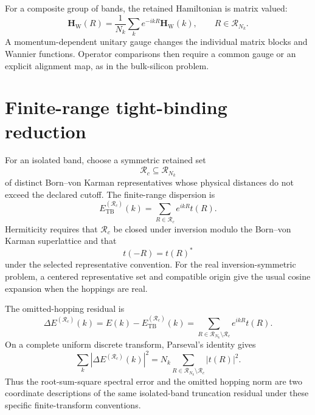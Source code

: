 For a composite group of bands, the retained Hamiltonian is matrix valued:
\begin{equation}
    \mathbf H_{\mathrm W}(R)
    =
    \frac{1}{N_k}
    \sum_k
    e^{-ikR}
    \mathbf H_{\mathrm W}(k),
    \qquad
    R\in\mathcal R_{N_k}.
\end{equation}
A momentum-dependent unitary gauge changes the individual matrix blocks and
Wannier functions. Operator comparisons then require a common gauge or an
explicit alignment map, as in the bulk-silicon problem.

\section*{Finite-range tight-binding reduction}

For an isolated band, choose a symmetric retained set
\begin{equation}
    \mathcal R_c
    \subseteq
    \mathcal R_{N_k}
\end{equation}
of distinct Born--von Karman representatives whose physical distances do not
exceed the declared cutoff. The finite-range dispersion is
\begin{equation}
    E_{\mathrm{TB}}^{(\mathcal R_c)}(k)
    =
    \sum_{R\in\mathcal R_c}
    e^{ikR}t(R).
\end{equation}
Hermiticity requires that $\mathcal R_c$ be closed under inversion modulo the
Born--von Karman superlattice and that
\begin{equation}
    t(-R)=t(R)^{\ast}
\end{equation}
under the selected representative convention. For the real
inversion-symmetric problem, a centered representative set and compatible
origin give the usual cosine expansion when the hoppings are real.

The omitted-hopping residual is
\begin{equation}
    \Delta E^{(\mathcal R_c)}(k)
    =
    E(k)-E_{\mathrm{TB}}^{(\mathcal R_c)}(k)
    =
    \sum_{R\in\mathcal R_{N_k}\setminus\mathcal R_c}
    e^{ikR}t(R).
\end{equation}
On a complete uniform discrete transform, Parseval's identity gives
\begin{equation}
    \sum_k
    \left|
        \Delta E^{(\mathcal R_c)}(k)
    \right|^2
    =
    N_k
    \sum_{R\in\mathcal R_{N_k}\setminus\mathcal R_c}
    |t(R)|^2.
\end{equation}
Thus the root-sum-square spectral error and the omitted hopping norm are two
coordinate descriptions of the same isolated-band truncation residual under
these specific finite-transform conventions.

